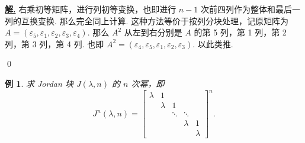 \documentclass[10pt,openany]{article}
\theoremstyle{thmstyle} %
\theoremstyle{defstyle} %
\theoremstyle{prostyle} %
\theoremstyle{exastyle}
\newtheorem{example}[theorem]{例}
\theoremstyle{remstyle}
\newenvironment{solution}{\par\underline{\textbf{解.}} \;\fangsong}{\qed\par}
\begin{document}
\begin{solution}
	右乘初等矩阵，进行列初等变换，也即进行 \( n-1 \) 次前四列作为整体和最后一列的互换变换. 那么完全同上计算. 这种方法等价于按列分块处理，记原矩阵为 \( A=(\varepsilon_5,\varepsilon_1,\varepsilon_2,\varepsilon_3,\varepsilon_4) \). 那么 \( A^2 \) 从左到右分别是 \( A \) 的第 5 列，第 1 列，第 2 列，第 3 列，第 4 列. 也即 \( A^2=(\varepsilon_4,\varepsilon_5,\varepsilon_1,\varepsilon_2,\varepsilon_3) \). 以此类推. 
	
	\vspace{1ex}
	
\end{solution}


\begin{example}
	求 Jordan 块 \( J(\lambda,n) \) 的 \( n \) 次幂，即
	\[ J^n(\lambda,n)=\begin{bmatrix}
		\lambda & 1 &  & & \\
		& \lambda & 1 & & \\
		& & \ddots & \ddots & \\
		& & & \lambda &1 \\
		& & & & \lambda
	\end{bmatrix}^n. \]
\end{example}
\end{document}
